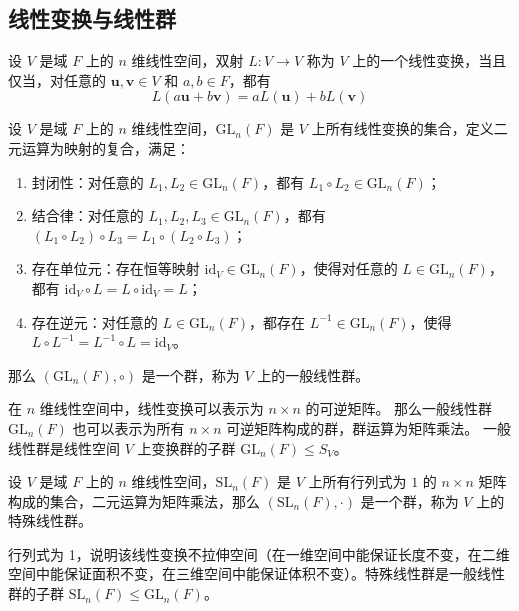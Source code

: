 \vspace{1em}
\subsection{线性变换与线性群}
\begin{definition}
    设 $V$ 是域 $F$ 上的 $n$ 维线性空间，双射 $L:V\to V$ 称为 $V$ 上的一个线性变换，当且仅当，对任意的 $\mathbf{u}, \mathbf{v}\in V$ 和 $a, b\in F$，都有
    \[
        L(a\mathbf{u} + b\mathbf{v}) = aL(\mathbf{u}) + bL(\mathbf{v})
    \]
\end{definition}

\begin{definition}
    设 $V$ 是域 $F$ 上的 $n$ 维线性空间，$\mathrm{GL}_n(F)$ 是 $V$ 上所有线性变换的集合，定义二元运算为映射的复合，满足：
    \begin{enumerate}
        \item 封闭性：对任意的 $L_1, L_2\in \mathrm{GL}_n(F)$，都有 $L_1 \circ L_2 \in \mathrm{GL}_n(F)$；
        \item 结合律：对任意的 $L_1, L_2, L_3\in \mathrm{GL}_n(F)$，都有 $(L_1 \circ L_2) \circ L_3 = L_1 \circ (L_2 \circ L_3)$；
        \item 存在单位元：存在恒等映射 $\mathrm{id}_V\in \mathrm{GL}_n(F)$，使得对任意的 $L\in \mathrm{GL}_n(F)$，都有 $\mathrm{id}_V \circ L = L \circ \mathrm{id}_V = L$；
        \item 存在逆元：对任意的 $L\in \mathrm{GL}_n(F)$，都存在 $L^{-1}\in \mathrm{GL}_n(F)$，使得 $L \circ L^{-1} = L^{-1} \circ L = \mathrm{id}_V$。
    \end{enumerate}    
    那么 $(\mathrm{GL}_n(F), \circ)$ 是一个群，称为 $V$ 上的一般线性群。
    \label{def:general_linear_group}
\end{definition}

\begin{note}
    在 $n$ 维线性空间中，线性变换可以表示为 $n\times n$ 的可逆矩阵。
    那么一般线性群 $\mathrm{GL}_n(F)$ 也可以表示为所有 $n\times n$ 可逆矩阵构成的群，群运算为矩阵乘法。
    一般线性群是线性空间 $V$ 上变换群的子群 $\mathrm{GL}_n(F) \leq S_V$。
\end{note}

\vspace{0.5em}

\begin{definition}
    设 $V$ 是域 $F$ 上的 $n$ 维线性空间，$\mathrm{SL}_n(F)$ 是 $V$ 上所有行列式为 $1$ 的 $n\times n$ 矩阵构成的集合，二元运算为矩阵乘法，那么 $(\mathrm{SL}_n(F), \cdot)$ 是一个群，称为 $V$ 上的特殊线性群。
\end{definition}
\begin{note}
    行列式为 1，说明该线性变换不拉伸空间（在一维空间中能保证长度不变，在二维空间中能保证面积不变，在三维空间中能保证体积不变）。特殊线性群是一般线性群的子群 $\mathrm{SL}_n(F) \leq \mathrm{GL}_n(F)$。
\end{note}


